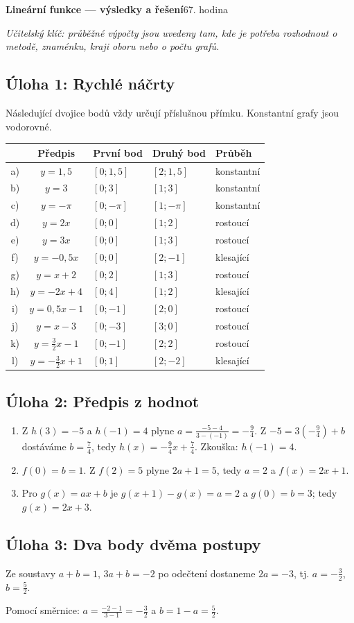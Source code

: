 \documentclass[10pt,a4paper]{article}
\newcommand{\key}[1]{\subsection*{Úloha #1}}
\begin{document}
{\Large\bfseries Lineární funkce --- výsledky a řešení}\hfill 67. hodina\par
\smallskip
\textit{Učitelský klíč: průběžné výpočty jsou uvedeny tam, kde je potřeba rozhodnout o metodě, znaménku, kraji oboru nebo o počtu grafů.}
\key{1: Rychlé náčrty}
Následující dvojice bodů vždy určují příslušnou přímku. Konstantní grafy jsou vodorovné.
\begin{center}\small
\begin{tabular}{@{}cclll@{}}\toprule
& Předpis & První bod & Druhý bod & Průběh\\\midrule
 a) & $y=1{,}5$ & $[0;1{,}5]$ & $[2;1{,}5]$ & konstantní\\
 b) & $y=3$ & $[0;3]$ & $[1;3]$ & konstantní\\
 c) & $y=-\pi$ & $[0;-\pi]$ & $[1;-\pi]$ & konstantní\\
 d) & $y=2x$ & $[0;0]$ & $[1;2]$ & rostoucí\\
 e) & $y=3x$ & $[0;0]$ & $[1;3]$ & rostoucí\\
 f) & $y=-0{,}5x$ & $[0;0]$ & $[2;-1]$ & klesající\\
 g) & $y=x+2$ & $[0;2]$ & $[1;3]$ & rostoucí\\
 h) & $y=-2x+4$ & $[0;4]$ & $[1;2]$ & klesající\\
 i) & $y=0{,}5x-1$ & $[0;-1]$ & $[2;0]$ & rostoucí\\
 j) & $y=x-3$ & $[0;-3]$ & $[3;0]$ & rostoucí\\
 k) & $y=\frac32x-1$ & $[0;-1]$ & $[2;2]$ & rostoucí\\
 l) & $y=-\frac32x+1$ & $[0;1]$ & $[2;-2]$ & klesající\\\bottomrule
\end{tabular}\end{center}
\key{2: Předpis z hodnot}
\begin{enumerate}[label=\alph*)]
\item Z $h(3)=-5$ a $h(-1)=4$ plyne
$a=\frac{-5-4}{3-(-1)}=-\frac94$. Z $-5=3(-\frac94)+b$ dostáváme
$b=\frac74$, tedy $\displaystyle h(x)=-\frac94x+\frac74$. Zkouška: $h(-1)=4$.
\item $f(0)=b=1$. Z $f(2)=5$ plyne $2a+1=5$, tedy $a=2$ a $f(x)=2x+1$.
\item Pro $g(x)=ax+b$ je $g(x+1)-g(x)=a=2$ a $g(0)=b=3$; tedy $g(x)=2x+3$.
\end{enumerate}
\key{3: Dva body dvěma postupy}
Ze soustavy $a+b=1$, $3a+b=-2$ po odečtení dostaneme $2a=-3$, tj. $a=-\frac32$, $b=\frac52$.\par
Pomocí směrnice: $a=\frac{-2-1}{3-1}=-\frac32$ a $b=1-a=\frac52$.
\end{document}
